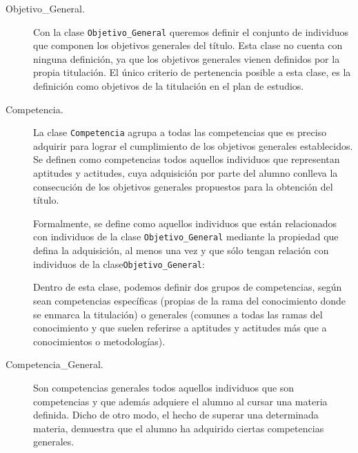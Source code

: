 	\begin{description}
    
		\item[Objetivo\_General.]
		Con la clase \lstinline!Objetivo_General! queremos definir el conjunto de individuos que componen los objetivos generales del título. Esta clase no cuenta con ninguna definición, ya que los objetivos generales vienen definidos por la propia titulación. El único criterio de pertenencia posible a esta clase, es la definición como objetivos de la titulación en el plan de estudios.
		
      
		\item[Competencia.]
		La clase \lstinline!Competencia! agrupa a todas las competencias que es preciso adquirir para lograr el cumplimiento de los objetivos generales establecidos. Se definen como competencias todos aquellos individuos que representan aptitudes y actitudes, cuya adquisición por parte del alumno conlleva la consecución de los objetivos generales propuestos para la obtención del título.
			
		Formalmente, se define como aquellos individuos que están relacionados con individuos de la clase \lstinline!Objetivo_General! mediante la propiedad que defina la adquisición, al menos una vez y que sólo tengan relación con individuos de la clase\lstinline!Objetivo_General!:
		
      
		Dentro de esta clase, podemos definir dos grupos de competencias, según sean competencias específicas (propias de la rama del conocimiento donde se enmarca la titulación) o generales (comunes a todas las ramas del conocimiento y que suelen referirse a aptitudes y actitudes más que a conocimientos o metodologías).

		\item[Competencia\_General.] Son competencias generales todos aquellos individuos que son competencias y que además adquiere el alumno al cursar una materia definida. Dicho de otro modo, el hecho de superar una determinada materia, demuestra que el alumno ha adquirido ciertas competencias generales.


\end{description}
